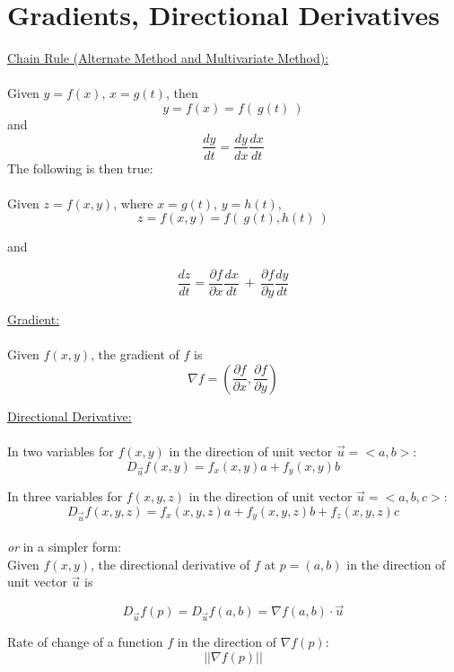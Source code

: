 \documentclass[12pt]{article}
\begin{document}
\maketitle

\section*{Gradients, Directional Derivatives}
\underline{Chain Rule (Alternate Method and Multivariate Method):}\\\\
Given $y= f(x)$, $x= g(t)$, then\\
$$
y = f(x) = f( \ g(t) \ )
$$
and
$$
\frac{dy}{dt} = \frac{dy}{dx} \frac{dx}{dt}
$$
The following is then true:\\\\
Given $z = f(x,y)$, where $x= g(t)$, $y= h(t)$,
$$
z = f(x,y) = f( \ g(t), h(t) \ )
$$

and

$$
\frac{dz}{dt} = \frac{\partial{f}}{\partial{x}} \frac{dx}{dt} \ + \ \frac{\partial{f}}{\partial{y}} \frac{dy}{dt}
$$

\noindent
\underline{Gradient:}\\\\
Given $f(x,y)$, the gradient of $f$ is\\
$$
\nabla f = \left(\frac{\partial{f}}{\partial{x}},\frac{\partial{f}}{\partial{y}}\right)
$$

\noindent
\underline{Directional Derivative:}\\\\
In two variables for $f(x,y)$ in the direction of unit vector $\vec{u}=<a,b>$:\\
$$
{D_{\vec u}}f\left( {x,y} \right) = {f_x}\left( {x,y} \right)a + {f_y}\left( {x,y} \right)b
$$

In three variables for $f(x,y,z)$ in the direction of unit vector $\vec{u}=<a,b,c>$:\\
$$
{D_{\vec u}}f\left( {x,y,z} \right) = {f_x}\left( {x,y,z} \right)a + {f_y}\left( {x,y,z} \right)b + {f_z}\left( {x,y,z} \right)c
$$
\\
\emph{or} in a simpler form:\\
Given $f(x,y)$, the directional derivative of $f$ at $p = (a,b)$ in the direction of unit vector $\vec{u}$ is

$$
{D_{\vec u}}f\left( {p} \right) = {D_{\vec u}}f\left( {a,b} \right) = \nabla f(a,b) \cdot \vec{u}
$$

Rate of change of a function $f$ in the direction of $\nabla f(p)$:\\
$$
||\nabla f(p)||
$$
\end{document}
